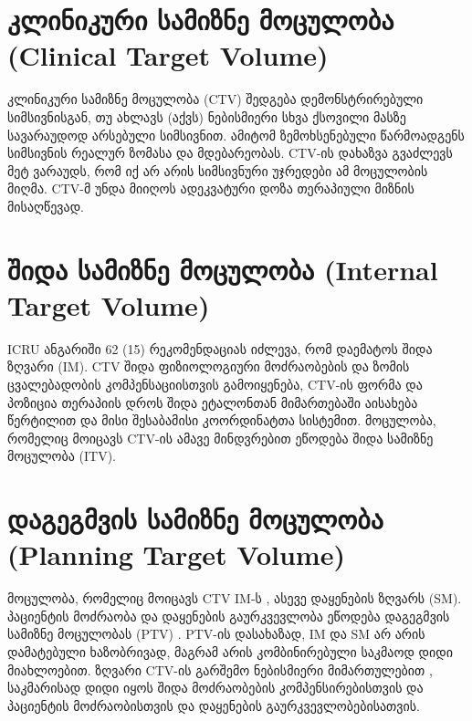 \documentclass[12pt,a4paper,]{report}
\begin{document}
\section{კლინიკური სამიზნე მოცულობა (Clinical Target Volume)}
კლინიკური სამიზნე მოცულობა (CTV) შედგება დემონსტრირებული სიმსივნისგან, თუ ახლავს (აქვს)  ნებისმიერი სხვა ქსოვილი მასზე სავარაუდოდ არსებული სიმსივნით.  ამიტომ ზემოხსენებული წარმოადგენს სიმსივნის რეალურ ზომასა და მდებარეობას. CTV-ის დახაზვა გვაძლევს მეტ ვარაუდს,  რომ იქ არ არის სიმსივნური უჯრედები ამ მოცულობის  მიღმა. CTV-მ უნდა მიიღოს ადეკვატური დოზა თერაპიული მიზნის მისაღწევად.

\section{შიდა სამიზნე მოცულობა (Internal Target Volume)}
ICRU ანგარიში 62 (15) რეკომენდაციას იძლევა, რომ დაემატოს შიდა ზღვარი (IM). CTV შიდა ფიზიოლოგიური მოძრაობების და ზომის ცვალებადობის კომპენსაციისთვის  გამოიყენება, CTV-ის ფორმა და პოზიცია თერაპიის დროს შიდა ეტალონთან მიმართებაში  აისახება წერტილით და მისი შესაბამისი კოორდინატთა სისტემით. მოცულობა, რომელიც  მოიცავს CTV-ის ამავე მინდვრებით ეწოდება შიდა სამიზნე მოცულობა (ITV).

\section{დაგეგმვის სამიზნე მოცულობა (Planning Target Volume)}
მოცულობა, რომელიც მოიცავს CTV IM-ს    , ასევე დაყენების ზღვარს (SM). პაციენტის მოძრაობა და დაყენების გაურკვევლობა ეწოდება დაგეგმვის  სამიზნე მოცულობას (PTV) . PTV-ის დასახაზად, IM და SM არ არის დამატებული  ხაზობრივად,  მაგრამ არის კომბინირებული საკმაოდ დიდი მიახლოებით.  ზღვარი CTV-ის გარშემო ნებისმიერი მიმართულებით , საკმარისად დიდი იყოს შიდა მოძრაობების კომპენსირებისთვის და პაციენტის მოძრაობისთვის და დაყენების გაურკვევლობებისათვის.
\end{document}
